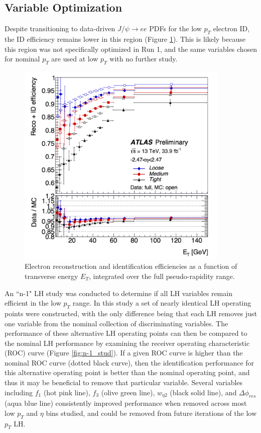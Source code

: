 \subsection{Variable Optimization}
Despite transitioning to data-driven $J/\psi\rightarrow ee$ PDFs for the low $p_T$ electron ID, the ID efficiency remains lower in this region (Figure \ref{fig:mc_data_eff}). This is likely because this region was not specifically optimized in Run 1, and the same variables chosen for nominal $p_T$ are used at low $p_T$ with no further study. \\

\begin{figure}[hbt!]
    \centering
    \includegraphics[width=4in]{figures/chapter5/mc_data_eff.pdf}
    \caption{Electron reconstruction and identification efficiencies as a function of transverse energy $E_T$, integrated over the full pseudo-rapidity range.}
    \label{fig:mc_data_eff}
\end{figure}

An ``n-1" LH study was conducted to determine if all LH variables remain efficient in the low $p_T$ range. In this study a set of nearly identical LH operating points were constructed, with the only difference being that each LH removes just one variable from the nominal collection of discriminating variables. The performance of these alternative LH operating points can then be compared to the nominal LH performance by examining the receiver operating characteristic (ROC) curve (Figure \ref{fig:n-1_stud}).  If a given ROC curve is higher than the nominal ROC curve (dotted black curve), then the identification performance for this alternative operating point is better than the nominal operating point, and thus it may be beneficial to remove that particular variable. Several variables including $f_1$ (hot pink line), $f_3$ (olive green line), $w_{\eta 2}$ (black solid line), and $\Delta\phi_{res}$ (aqua blue line) consistently improved performance when removed across most low $p_T$ and $\eta$ bins studied, and could be removed from future iterations of the low $p_T$ LH.\\

